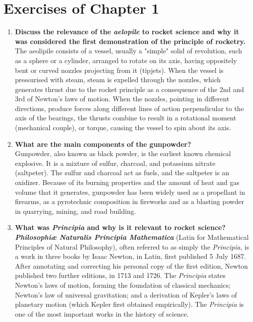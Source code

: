 \section{Exercises of Chapter 1}

\begin{enumerate}
	\item {\bf Discuss the relevance of the \textit{aelopile} to rocket science and why it was considered the first demonstration of the principle of rocketry.}\\

The aeolipile consists of a vessel, usually a "simple" solid of revolution, such as a sphere or a cylinder, arranged to rotate on its axis, having oppositely bent or curved nozzles projecting from it (tipjets). When the vessel is pressurised with steam, steam is expelled through the nozzles, which generates thrust due to the rocket principle as a consequence of the 2nd and 3rd of Newton's laws of motion. When the nozzles, pointing in different directions, produce forces along different lines of action perpendicular to the axis of the bearings, the thrusts combine to result in a rotational moment (mechanical couple), or torque, causing the vessel to spin about its axis. \cite{aeolipile}

	\item {\bf What are the main components of the gunpowder?}\\
	
Gunpowder, also known as black powder, is the earliest known chemical explosive. It is a mixture of sulfur, charcoal, and potassium nitrate (saltpeter). The sulfur and charcoal act as fuels, and the saltpeter is an oxidizer. Because of its burning properties and the amount of heat and gas volume that it generates, gunpowder has been widely used as a propellant in firearms, as a pyrotechnic composition in fireworks and as a blasting powder in quarrying, mining, and road building. \cite{gunpowder}
	
	\item {\bf What was \textit{Principia} and why is it relevant to rocket science?}\\

\textit{\textbf{Philosophiæ Naturalis Principia Mathematica}} (Latin for Mathematical Principles of Natural Philosophy), often referred to as simply the \textit{Principia}, is a work in three books by Isaac Newton, in Latin, first published 5 July 1687. After annotating and correcting his personal copy of the first edition, Newton published two further editions, in 1713 and 1726. The \textit{Principia} states Newton's laws of motion, forming the foundation of classical mechanics; Newton's law of universal gravitation; and a derivation of Kepler's laws of planetary motion (which Kepler first obtained empirically). The \textit{Principia} is one of the most important works in the history of science. \cite{principia}


\end{enumerate}
